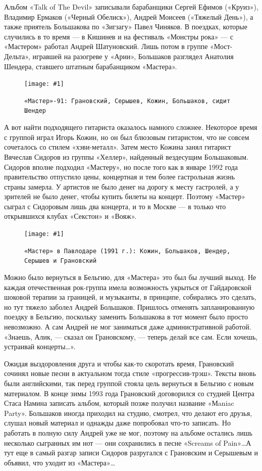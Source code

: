 \documentclass[10pt, twoside]{book}
\newcommand{\myincludegraphics}[1]{\texttt{[image: \#1]}}
\begin{document}
Альбом «Talk of The Devil» записывали барабанщики Сергей Ефимов («Круиз»), Владимир Ермаков («Черный Обелиск»), Андрей
Моисеев («Тяжелый День»), а также приятель Большакова по «Зигзагу» Павел Чиняков. В поездках, которые случились в то
время — в Кишинев и на фестиваль «Монстры рока» — с «Мастером» работал Андрей Шатуновский. Лишь потом в группе
«Мост-Дельта», игравшей на разогреве у «Арии», Большаков разглядел Анатолия Шендера, ставшего штатным барабанщиком
«Мастера».

\begin{figure}[h]
    \centering
    \myincludegraphics{Image28}
    \caption{\texttt{«Мастер»-91: Грановский, Серышев, Кожин, Большаков, сидит Шендер}}
\end{figure}

А вот найти подходящего гитариста оказалось намного сложнее. Некоторое время с группой играл Игорь Кожин, но он был
блюзовым гитаристом, что не совсем сочеталось со стилем «хэви-металл». Затем место Кожина занял гитарист Вячеслав
Сидоров из группы «Хеллер», найденный вездесущим Большаковым. Сидоров вполне подходил «Мастеру», но после того как в
январе 1992 года правительство отпустило цены, концертная и тем более гастрольная жизнь страны замерла. У артистов не
было денег на дорогу к месту гастролей, а у зрителей не было денег, чтобы купить билеты на концерт. Поэтому «Мастер»
сыграл с Сидоровым лишь два концерта, и то в Москве — в только что открывшихся клубах «Секстон» и «Вояж».

\begin{figure}[h]
    \centering
    \myincludegraphics{Image29}
    \caption{\texttt{«Мастер» в Павлодаре (1991 г.): Кожин, Большаков, Шендер, Серышев и Грановский}}
\end{figure}

Можно было вернуться в Бельгию, для «Мастера» это был бы лучший выход. Не каждая отечественная рок-группа имела
возможность укрыться от Гайдаровской шоковой терапии за границей, и музыканты, в принципе, собирались это сделать, но
тут тяжело заболел Андрей Большаков. Пришлось отменять запланированную поездку в Бельгию, поскольку заменить Большакова
в тот момент было просто невозможно. А сам Андрей не мог заниматься даже административной работой. «Знаешь, Алик, —
сказал он Грановскому, — теперь делай все сам. Если хочешь, устраивай концерты\ldots».

Ожидая выздоровления друга и чтобы как-то скоротать время, Грановский сочинял новые песни в актуальном тогда стиле
«прогрессив-трэш». Тексты вновь были английскими, так перед группой стояла цель вернуться в Бельгию с новым материалом.
В конце зимы 1993 года Грановский договорился со студией Центра Стаса Намина записать альбом, который позже получил
название «Мaniac Party». Большаков иногда приходил на студию, смотрел, что делают его друзья, слушал новый материал и
однажды даже попробовал что-то записать. Но работать в полную силу Андрей уже не мог, поэтому на альбоме остались лишь
несколько сыгранных им нот — они сохранились в песне «Screams of Pain»\ldots А тут еще в самый разгар записи Сидоров
разругался с Грановским и Серышевым и объявил, что уходит из «Мастера»\ldots
\end{document}
